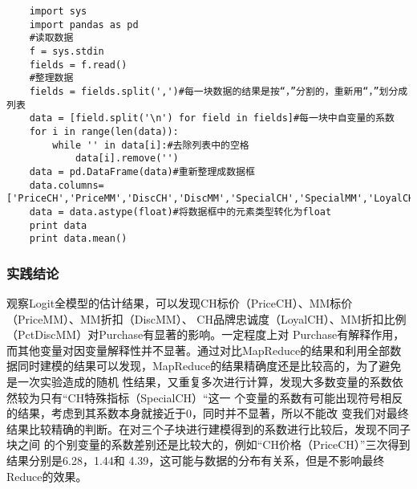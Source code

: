 \begin{lstlisting}
	import sys
	import pandas as pd
	#读取数据
	f = sys.stdin
	fields = f.read()
	#整理数据
	fields = fields.split(',')#每一块数据的结果是按“，”分割的，重新用“，”划分成列表
	data = [field.split('\n') for field in fields]#每一块中自变量的系数
	for i in range(len(data)):
	    while '' in data[i]:#去除列表中的空格
	        data[i].remove('')
	data = pd.DataFrame(data)#重新整理成数据框
	data.columns=['PriceCH','PriceMM','DiscCH','DiscMM','SpecialCH','SpecialMM','LoyalCH','Intercept']
	data = data.astype(float)#将数据框中的元素类型转化为float
	print data
	print data.mean()
\end{lstlisting}

\subsubsection{实践结论}\label{ux5b9eux8df5ux7ed3ux8bba}

观察Logit全模型的估计结果，可以发现CH标价（PriceCH）、MM标价（PriceMM）、MM折扣（DiscMM）、
CH品牌忠诚度（LoyalCH）、MM折扣比例（PctDiscMM）对Purchase有显著的影响。一定程度上对
Purchase有解释作用，而其他变量对因变量解释性并不显著。通过对比MapReduce的结果和利用全部数
据同时建模的结果可以发现，MapReduce的结果精确度还是比较高的，为了避免是一次实验造成的随机
性结果，又重复多次进行计算，发现大多数变量的系数依然较为只有``CH特殊指标（SpecialCH）``这一
个变量的系数有可能出现符号相反的结果，考虑到其系数本身就接近于0，同时并不显著，所以不能改
变我们对最终结果比较精确的判断。在对三个子块进行建模得到的系数进行比较后，发现不同子块之间
的个别变量的系数差别还是比较大的，例如``CH价格（PriceCH）''三次得到结果分别是6.28，1.44和
4.39，这可能与数据的分布有关系，但是不影响最终Reduce的效果。

